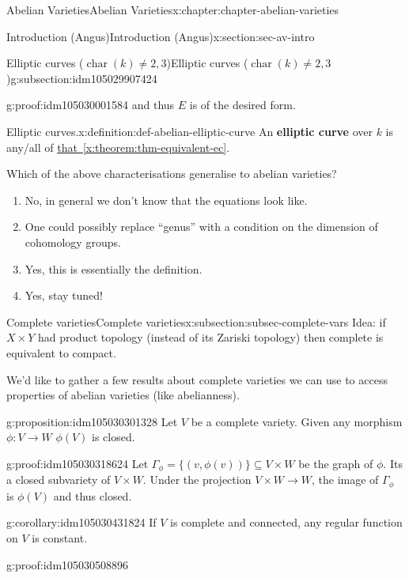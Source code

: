 \documentclass[oneside,10pt,]{book}
\newcommand{\terminology}[1]{\textbf{#1}}
\numberwithin{equation}{section}
\DeclareMathOperator{\characteristic}{char}
\begin{document}
\begin{chapterptx}{Abelian Varieties}{}{Abelian Varieties}{}{}{x:chapter:chapter-abelian-varieties}
\begin{sectionptx}{Introduction (Angus)}{}{Introduction (Angus)}{}{}{x:section:sec-av-intro}
\begin{subsectionptx}{Elliptic curves (\(\characteristic(k) \ne 2,3\))}{}{Elliptic curves (\(\characteristic(k) \ne 2,3\))}{}{}{g:subsection:idm105029907424}
\begin{proofptx}{}{g:proof:idm105030001584}
and thus \(E\) is of the desired form.%
\end{proofptx}
\begin{definition}{Elliptic curves.}{x:definition:def-abelian-elliptic-curve}%
An \terminology{elliptic curve} over \(k\) is any\slash{}all of \hyperref[x:theorem:thm-equivalent-ec]{that~\ref{x:theorem:thm-equivalent-ec}}.%
\end{definition}
Which of the above characterisations generalise to abelian varieties?%
\begin{enumerate}
\item{}No, in general we don't know that the equations look like.%
\item{}One could possibly replace ``genus'' with a condition on the dimension of cohomology groups.%
\item{}Yes, this is essentially the definition.%
\item{}Yes, stay tuned!%
\end{enumerate}
%
\end{subsectionptx}
%
%
\typeout{************************************************}
\typeout{************************************************}
%
\begin{subsectionptx}{Complete varieties}{}{Complete varieties}{}{}{x:subsection:subsec-complete-vars}
Idea: if \(X \times Y\) had product topology (instead of its Zariski topology) then complete is equivalent to compact.%
\par
We'd like to gather a few results about complete varieties we can use to access properties of abelian varieties (like abelianness).%
\begin{proposition}{}{}{g:proposition:idm105030301328}%
Let \(V\) be a complete variety. Given any morphism \(\phi\colon V \to W\) \(\phi (V) \) is closed.%
\end{proposition}
\begin{proofptx}{}{g:proof:idm105030318624}
Let \(\Gamma_\phi = \{(v, \phi(v))\} \subseteq V\times W\) be the graph of \(\phi\). Its a closed subvariety of \(V\times W\). Under the projection \(V\times W \to W\), the image of \(\Gamma_\phi\) is \(\phi(V)\) and thus closed.%
\end{proofptx}
\begin{corollary}{}{}{g:corollary:idm105030431824}%
If \(V\) is complete and connected, any regular function on \(V\) is constant.%
\end{corollary}
\begin{proofptx}{}{g:proof:idm105030508896}

\end{proofptx}
\end{subsectionptx}
\end{sectionptx}
\end{chapterptx}
\end{document}
